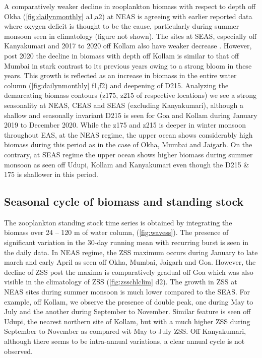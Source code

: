 \documentclass{article}
\begin{document}
	A comparatively weaker decline in zooplankton biomass with respect to depth off Okha (\cref{fig:dailynmonthly} a1,a2) at NEAS is agreeing with earlier reported data \citep{wishner1998mesozooplankton,madhupratap2001mesozooplankton,smith2005mesozooplankton,jyothibabu2010re} where oxygen deficit is thought to be the cause, particularly during summer monsoon seen in \citet{garcia2013oxygen} climatology (figure not shown). The sites at SEAS, especially off Kanyakumari and 2017 to 2020 off Kollam also have weaker decrease \citep{madhupratap2001mesozooplankton,jyothibabu2010re,aparna2022seasonal}. However, post 2020 the decline in biomass with depth off Kollam is similar to that off Mumbai in stark contrast to its previous years owing to a strong bloom in these years. This growth is reflected as an increase in biomass in the entire water column (\cref{fig:dailynmonthly} f1,f2) and deepening of D215. Analyzing the demarcating biomass contours (z175, z215 of respective locations) we see a strong seasonality at NEAS, CEAS and SEAS (excluding Kanyakumari), although a shallow and seasonally invariant D215 is seen for Goa and Kollam  during January 2019 to December 2020. While the z175 and z215 is deeper in winter monsoon throughout EAS, at the NEAS regime, the upper ocean shows considerably high biomass during this period as in the case of Okha, Mumbai and Jaigarh. On the contrary, at SEAS regime the upper ocean shows higher biomass during summer monsoon as seen off Udupi, Kollam and Kanyakumari even though the D215 \& 175 is shallower in this period. 
	
	\subsection{Seasonal cycle of biomass and standing stock}
	\label{sec:seasonalcyclezss}
	The zooplankton standing stock time series is obtained by integrating the biomass over 24 -- 120 m of water column, (\cref{fig:wavess}). The presence of significant variation in the 30-day running mean with recurring burst is seen in the daily data. 
	In NEAS regime, the ZSS maximum occurs during January to late march and early April as seen off Okha, Mumbai, Jaigarh and Goa. However, the decline of ZSS post the maxima is comparatively gradual off Goa which was also visible in the climatology of ZSS (\cref{fig:zsschlclim} d2). The growth in ZSS at NEAS sites during summer monsoon is much lower compared to the SEAS. For example, off Kollam, we observe the presence of double peak, one during May to July and the another during September to November. Similar feature is seen off Udupi, the nearest northern site of Kollam, but with a much higher ZSS during September to November as compared wit May to July ZSS. Off Kanyakumari, although there seems to be intra-annual variations, a clear annual cycle is not observed.
	
\end{document}
